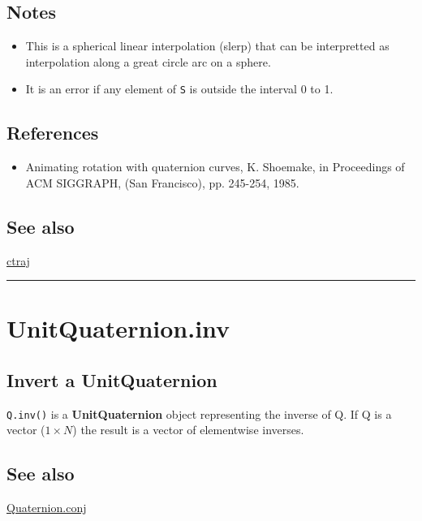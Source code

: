 \subsection*{Notes}
\begin{itemize}
  \item This is a spherical linear interpolation (slerp) that can be interpretted    as interpolation along a great circle arc on a sphere.
  \item It is an error if any element of \texttt{S} is outside the interval 0 to 1.
\end{itemize}

\subsection*{References}
\begin{itemize}
  \item Animating rotation with quaternion curves, K. Shoemake,    in Proceedings of ACM SIGGRAPH, (San Francisco), pp. 245-254, 1985.
\end{itemize}

\subsection*{See also}


\hyperlink{ctraj}{\color{blue} ctraj}

\vspace{1.5ex}\hrule

\hypertarget{UnitQuaternion.inv}{\section*{UnitQuaternion.inv}}
\subsection*{Invert a UnitQuaternion}


\texttt{Q.inv()} is a \textbf{\color{red} UnitQuaternion} object representing the inverse of Q.  If
Q is a vector ($1 \times N$) the result is a vector of elementwise inverses.


\subsection*{See also}


\hyperlink{Quaternion.conj}{\color{blue} Quaternion.conj}

